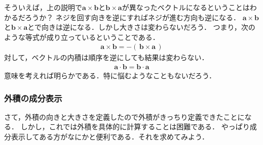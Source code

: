 そういえば，上の説明で$\bm{a} \times \bm{b}$と$\bm{b} \times \bm{a}$が異なったベクトルになるということはわかるだろうか？ 
ネジを回す向きを逆にすればネジが進む方向も逆になる．
$\bm{a} \times \bm{b}$と$\bm{b} \times \bm{a}$とで向きは逆になる．しかし大きさは変わらないだろう．
つまり，次のような等式が成り立っているということである．
\begin{align}
\bm{a} \times \bm{b} = - ( \, \bm{b} \times \bm{a} \, ) 
\label{eq:gaisekihantaisyou}
\end{align}
対して，ベクトルの内積は順序を逆にしても結果は変わらない．
\begin{align}
\bm{a} \cdot \bm{b} = \bm{b} \cdot \bm{a}
\label{eq:naisekitaisyou}
\end{align}
意味を考えれば明らかである．特に悩むようなこともないだろう．

\subsubsection{外積の成分表示}
さて，外積の向きと大きさを定義したので外積がきっちり定義できたことになる．
しかし，これでは外積を具体的に計算することは困難である．
やっぱり成分表示してある方がなにかと便利である．それを求めてみよう．

